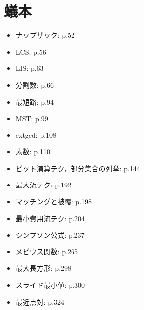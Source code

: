 \section{蟻本}

\begin{itemize}
    \item ナップザック: p.52~
    \item LCS: p.56
    \item LIS: p.63
    \item 分割数: p.66
    \item 最短路: p.94
    \item MST: p.99
    \item extgcd: p.108
    \item 素数: p.110
    \item ビット演算テク，部分集合の列挙: p.144
    \item 最大流テク: p.192
    \item マッチングと被覆: p.198
    \item 最小費用流テク: p.204
    \item シンプソン公式: p.237
    \item メビウス関数: p.265
    \item 最大長方形: p.298
    \item スライド最小値: p.300
    \item 最近点対: p.324
\end{itemize}